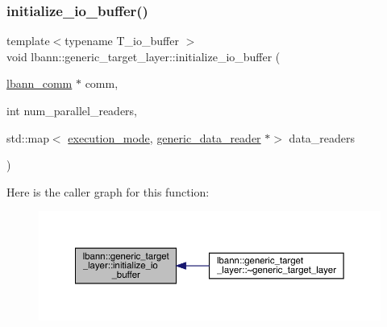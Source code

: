 \subsubsection{\texorpdfstring{initialize\+\_\+io\+\_\+buffer()}{initialize\_io\_buffer()}\hspace{0.1cm}{\footnotesize\ttfamily [1/3]}}
{\footnotesize\ttfamily template$<$typename T\+\_\+io\+\_\+buffer $>$ \\
void lbann\+::generic\+\_\+target\+\_\+layer\+::initialize\+\_\+io\+\_\+buffer (\begin{DoxyParamCaption}\item[{\hyperlink{classlbann_1_1lbann__comm}{lbann\+\_\+comm} $\ast$}]{comm,  }\item[{int}]{num\+\_\+parallel\+\_\+readers,  }\item[{std\+::map$<$ \hyperlink{base_8hpp_a2781a159088df64ed7d47cc91c4dc0a8}{execution\+\_\+mode}, \hyperlink{classlbann_1_1generic__data__reader}{generic\+\_\+data\+\_\+reader} $\ast$$>$}]{data\+\_\+readers }\end{DoxyParamCaption})\hspace{0.3cm}{\ttfamily [inline]}}

Here is the caller graph for this function\+:\nopagebreak
\begin{figure}[H]
\begin{center}
\leavevmode
\includegraphics[width=350pt]{classlbann_1_1generic__target__layer_a46f2192139bd8cec23a20e1c9b67869d_icgraph}
\end{center}
\end{figure}
\mbox{\label{classlbann_1_1generic__target__layer_a01a04bc2f6e6440082a1255b0de32d95}} 
